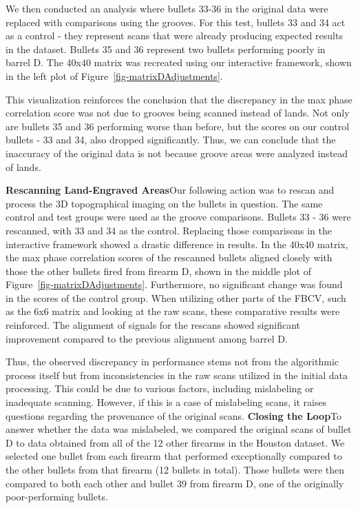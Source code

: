 \documentclass[
  12pt]{article}
\begin{document}
We then conducted an analysis where bullets 33-36 in the original data
were replaced with comparisons using the grooves. For this test, bullets
33 and 34 act as a control - they represent scans that were already
producing expected results in the dataset. Bullets 35 and 36 represent
two bullets performing poorly in barrel D. The 40x40 matrix was
recreated using our interactive framework, shown in the left plot of
Figure~\ref{fig-matrixDAdjustments}.

This visualization reinforces the conclusion that the discrepancy in the
max phase correlation score was not due to grooves being scanned instead
of lands. Not only are bullets 35 and 36 performing worse than before,
but the scores on our control bullets - 33 and 34, also dropped
significantly. Thus, we can conclude that the inaccuracy of the original
data is not because groove areas were analyzed instead of lands.

\hfill\newline\noindent \textbf{Rescanning Land-Engraved
Areas}\hfill\newline Our following action was to rescan and process the
3D topographical imaging on the bullets in question. The same control
and test groups were used as the groove comparisons. Bullets 33 - 36
were rescanned, with 33 and 34 as the control. Replacing those
comparisons in the interactive framework showed a drastic difference in
results. In the 40x40 matrix, the max phase correlation scores of the
rescanned bullets aligned closely with those the other bullets fired
from firearm D, shown in the middle plot of
Figure~\ref{fig-matrixDAdjustments}. Furthermore, no significant change
was found in the scores of the control group. When utilizing other parts
of the FBCV, such as the 6x6 matrix and looking at the raw scans, these
comparative results were reinforced. The alignment of signals for the
rescans showed significant improvement compared to the previous
alignment among barrel D.

Thus, the observed discrepancy in performance stems not from the
algorithmic process itself but from inconsistencies in the raw scans
utilized in the initial data processing. This could be due to various
factors, including mislabeling or inadequate scanning. However, if this
is a case of mislabeling scans, it raises questions regarding the
provenance of the original scans. \hfill\newline\noindent
\textbf{Closing the Loop}\hfill\newline To answer whether the data was
mislabeled, we compared the original scans of bullet D to data obtained
from all of the 12 other firearms in the Houston dataset. We selected
one bullet from each firearm that performed exceptionally compared to
the other bullets from that firearm (12 bullets in total). Those bullets
were then compared to both each other and bullet 39 from firearm D, one
of the originally poor-performing bullets.
\end{document}
